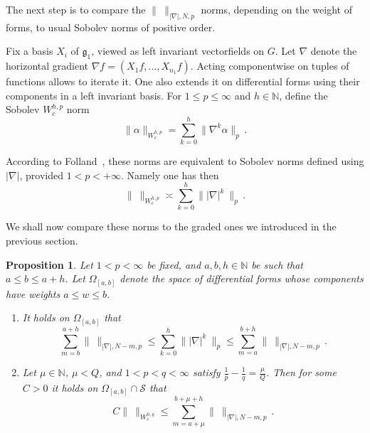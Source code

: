 \documentclass[11pt]{article}
\newtheorem{prop}[theo]{Proposition}
\theoremstyle{definition}
\numberwithin{equation}{section}
\numberwithin{figure}{section}
\numberwithin{table}{section}
\newcommand{\N}{\mathbb{N}}
\begin{document}
The next step is to compare the $\|\ \|_{|\nabla|, N,p}$ norms, depending on the weight of forms, to usual Sobolev norms of positive order.

Fix a basis $X_i$ of $\mathfrak{g}_1$, viewed as left invariant vectorfields on $G$. Let $\nabla$ denote the horizontal gradient $\nabla f=(X_1 f,\dots,X_{n_1} f)$. Acting componentwise on tuples of functions allows to iterate it. One also extends it on differential forms using their components in a left invariant basis. For $1 \leq p \leq \infty$ and $h \in \N$, define the Sobolev $W_c^{h,p}$ norm
\[
\|\alpha\|_{W_c^{h,p}} = \sum_{k=0}^{h}\|\nabla^k\alpha\|_p \,.
\]

According to Folland~\cite[Theorem~4.10, Corollary~4.13]{Folland_1975}, these norms are equivalent to Sobolev norms defined using $|\nabla|$, provided $1<p<+\infty$. Namely one has then
\begin{equation}\label{eq:11}
\|\ \|_{W_c^{h,p}} \asymp\sum_{k=0}^{h}\||\nabla|^k \ \|_p \,.
\end{equation}

We shall now compare these norms to the graded ones we introduced in the previous section.

\begin{prop}\label{prop:Sobolev}
Let $1< p< \infty$ be fixed, and $a, b, h \in \N$ be such that $a\leq b \leq a+h$. Let $\Omega_{[a,b]}$ denote the space of differential forms whose components have weights $a\leq w \leq b$.
\begin{enumerate}%
\item \label{6.1.1} It holds on $\Omega_{[a,b]}$ that
\[
\sum_{m=b}^{a+h} \|\ \|_{|\nabla|, N-m, p} \leq
\sum_{k=0}^{h}\||\nabla|^k \ \|_p \leq
\sum_{m=a}^{b+h} \|\ \|_{|\nabla|, N-m, p}\,.
\]

\item \label{6.1.2} Let $\mu \in \N$, $\mu<Q$, and $1< p< q< \infty$ satisfy $\frac{1}{p} - \frac{1}{q} = \frac{\mu}{Q}$. Then for some $C>0$ it holds on $\Omega_{[a,b]} \cap \mathcal{S}$ that
\[
C \| \ \|_{W^{h,q}_c} \leq \sum_{m=a+ \mu}^{b+\mu + h} \| \
\|_{|\nabla|, N-m,p} \,.
\]
\end{enumerate}
\end{prop}
\end{document}
